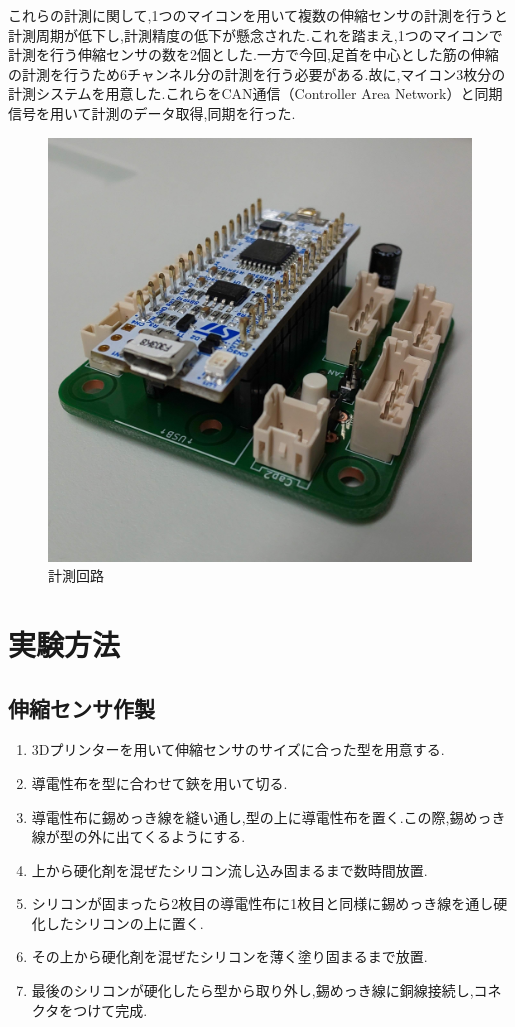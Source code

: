 これらの計測に関して,1つのマイコンを用いて複数の伸縮センサの計測を行うと計測周期が低下し,計測精度の低下が懸念された.これを踏まえ,1つのマイコンで計測を行う伸縮センサの数を2個とした.一方で今回,足首を中心とした筋の伸縮の計測を行うため6チャンネル分の計測を行う必要がある.故に,マイコン3枚分の計測システムを用意した.これらをCAN通信（Controller Area Network）と同期信号を用いて計測のデータ取得,同期を行った.
\begin{figure}[!t]
 \begin{center}
  \includegraphics[width=0.5\columnwidth,clip]{Photo/BackGround/circuit.eps}
  \caption{計測回路}
  \label{circuit}
 \end{center}
\end{figure}

\section{実験方法}
\subsection{伸縮センサ作製}
\begin{enumerate}
    \item 3Dプリンターを用いて伸縮センサのサイズに合った型を用意する.
    \item 導電性布を型に合わせて鋏を用いて切る.
    \item 導電性布に錫めっき線を縫い通し,型の上に導電性布を置く.この際,錫めっき線が型の外に出てくるようにする.
    \item 上から硬化剤を混ぜたシリコン流し込み固まるまで数時間放置.
    \item シリコンが固まったら2枚目の導電性布に1枚目と同様に錫めっき線を通し硬化したシリコンの上に置く.
    \item その上から硬化剤を混ぜたシリコンを薄く塗り固まるまで放置.
    \item 最後のシリコンが硬化したら型から取り外し,錫めっき線に銅線接続し,コネクタをつけて完成.
\end{enumerate}
